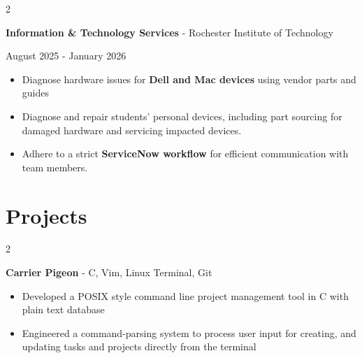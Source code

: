 \documentclass[10pt, letterpaper]{article}
\newenvironment{highlights}{
    \begin{itemize}[
        topsep=0.10 cm,
        parsep=0.10 cm,
        partopsep=0pt,
        itemsep=0pt,
        leftmargin=0.4 cm + 10pt
    ]
}{
    \end{itemize}
} %
\newenvironment{twocolentry}[2][]{
    \onecolentry
    \def\secondColumn{#2}
    \setcolumnwidth{\fill, 4.5 cm}
    \begin{paracol}{2}
}{
    \switchcolumn \raggedleft \secondColumn
    \end{paracol}
    \endonecolentry
} %
\let\hrefWithoutArrow\href
\renewcommand{\href}[2]{\hrefWithoutArrow{#1}{\ifthenelse{\equal{#2}{}}{ }{#2 }\raisebox{.15ex}{\footnotesize \faExternalLink*}}}
\begin{document}
        \vspace{0.05 cm}
        
\begin{twocolentry}
    {August 2025 - January 2026}
    {\textbf{Information \& Technology Services} - Rochester Institute of Technology}
\end{twocolentry}
            \begin{highlights}
                
            \item Diagnose hardware issues for {\color{purple}\textbf{Dell and Mac devices}} using vendor parts and guides
                \item Diagnose and repair students' personal devices, including part sourcing for damaged hardware and servicing impacted devices.
                \item Adhere to a strict {\color{purple}\textbf{ServiceNow workflow}} for efficient communication with team members.
            \end{highlights}

    \vspace{-0.2cm}

   \section{\large\bfseries Projects} 
      
  \begingroup

        
        \begin{twocolentry}{
            \hrefWithoutArrow{https://github.com/shaeespring/CarrierPigeon}{{\footnotesize\faGithub}\hspace*{0.13cm}{shaeespring/CarrierPigeon}}
        }
            \textbf{Carrier Pigeon} - C, Vim, Linux Terminal, Git \begin{highlights}
                \item Developed a POSIX style command line project management tool in C with plain text database
                \item Engineered a command-parsing system to process user input for creating, and updating tasks and projects directly from the terminal
            \end{highlights}
        \end{twocolentry}


        \vspace{0.05 cm}
\end{document}
